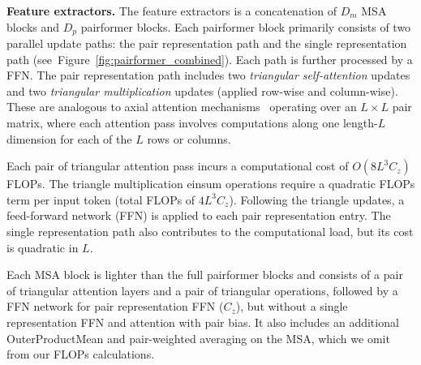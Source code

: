 \documentclass{article} %
\renewcommand{\paragraph}[1]{\vspace{1.25mm}\noindent\textbf{#1}}
\newcommand{\reffig}[1]{Figure~\ref{fig:#1}}
\begin{document}
\paragraph{Feature extractors.}
The feature extractors is a concatenation of $D_m$ MSA blocks and $D_p$ pairformer blocks.
Each pairformer block primarily consists of two parallel update paths: the pair representation path and the single representation path (see~\reffig{pairformer_combined}).
Each path is further processed by a FFN. The pair representation path includes two \textit{triangular self-attention} updates and two \textit{triangular multiplication} updates (applied row-wise and column-wise). These are analogous to axial attention mechanisms~\citep{ho2019axial} operating over an $L \times L$ pair matrix, where each attention pass involves computations along one length-$L$ dimension for each of the $L$ rows or columns.

Each pair of triangular attention pass incurs a computational cost of $O(8 L^3 C_z)$ FLOPs. 
The triangle multiplication einsum operations require a quadratic FLOPs term per input token (total FLOPs of $4 L^3 C_z$).
Following the triangle updates, a feed-forward network (FFN) is applied to each pair representation entry. The single representation path also contributes to the computational load, but its cost is quadratic in $L$.

Each MSA block is lighter than the full pairformer blocks and consists of a pair of triangular attention layers and a pair of triangular operations, followed by a FFN network for pair representation FFN ($C_z$), but without a single representation FFN and attention with pair bias.
It also includes an additional OuterProductMean and pair-weighted averaging on the MSA, which we omit from our FLOPs calculations.
\end{document}
